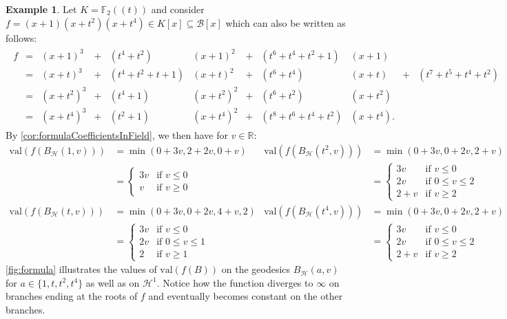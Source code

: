 \documentclass[10pt]{article}
\theoremstyle{definition}
\newtheorem{example}[theorem]{Example}
\newcommand{\RR}{\mathbb{R}}
\newcommand{\FF}{\mathbb{F}}
\newcommand{\val}{{\mathrm{val}}}
\begin{document}
\begin{example}
  \label{ex:formula}
  Let $K = \FF_2(\!(t)\!)$ and consider $f=(x+1)(x+t^2)(x+t^4)\in K[x]\subseteq \mathcal B[x]$ which can also be written as follows:
  {
    \setlength{\arraycolsep}{2pt}
    \begin{align*}
      \begin{array}{rcrcrrcrrcr}
        f&=&(x+1)^3&+&(t^4 + t^2)&(x+1)^2&+&(t^6 + t^4 + t^2 + 1)&(x+1)\phantom{.}&&\\[1mm]
         &=&(x+t)^3&+&(t^4 + t^2 + t + 1)&(x+t)^2&+&(t^6 + t^4)&(x+t)\phantom{.}&+&(t^7 + t^5 + t^4 + t^2)\\[1mm]
         &=&(x+t^2)^3&+&(t^4 + 1)&(x+t^2)^2&+&(t^6 + t^2)&(x+t^2)\phantom{.}\\[1mm]
         &=&(x+t^4)^3&+&(t^2 + 1)&(x+t^4)^2&+&(t^8 + t^6 + t^4 + t^2)&(x+t^4).    \end{array}
    \end{align*}
  }
  By \cref{cor:formulaCoefficientsInField}, we then have for $v\in\RR$:
  \begin{align*}
    \val(f(B_{\mathcal{H}}(1,v)))
    &=\min(0+3v,2+2v,0+v)
    &\val(f(B_{\mathcal{H}}(t^2,v)))
    &=\min(0+3v,0+2v,2+v)\\
    &=
      \begin{cases}
        3v &\text{if }v\leq 0\\
        v&\text{if }v\geq 0
      \end{cases}
    & &=
        \begin{cases}
          3v&\text{if }v\leq 0\\
          2v&\text{if }0\leq v\leq 2\\
          2+v&\text{if }v\geq 2
        \end{cases}
    \\
    \val(f(B_{\mathcal{H}}(t,v)))&=\min(0+3v,0+2v,4+v,2)
    &\val(f(B_{\mathcal{H}}(t^4,v)))&=\min(0+3v,0+2v,2+v)\\
    &=
      \begin{cases}
        3v&\text{if }v\leq 0\\
        2v&\text{if }0\leq v\leq 1\\
        2&\text{if }v\geq 1
      \end{cases}
    & &=
        \begin{cases}
          3v&\text{if }v\leq 0\\
          2v&\text{if }0\leq v\leq 2\\
          2+v&\text{if }v\geq 2
        \end{cases}
  \end{align*}
  \cref{fig:formula} illustrates the values of $\val(f(B))$ on the geodesics $B_{\mathcal{H}}(a,v)$ for $a\in\{1,t,t^2,t^4\}$ as well as on $\mathcal H^1$. Notice how the function diverges to $\infty$ on branches ending at the roots of $f$ and eventually becomes constant on the other branches.
\end{example}
\end{document}
